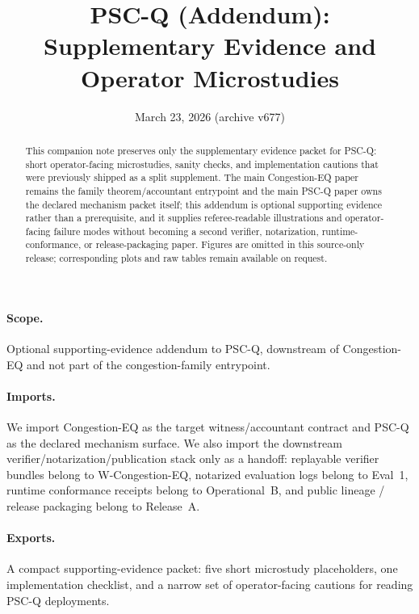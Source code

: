 \documentclass[11pt]{article}
\title{PSC-Q (Addendum):\\Supplementary Evidence and Operator Microstudies}
\author{}
\date{March 23, 2026 (archive v677)}
\theoremstyle{definition}
\theoremstyle{remark}
\begin{document}
\maketitle

\begin{abstract}
This companion note preserves only the supplementary evidence packet for PSC-Q: short operator-facing microstudies, sanity checks, and implementation cautions that were previously shipped as a split supplement.
The main Congestion-EQ paper remains the family theorem/accountant entrypoint and the main PSC-Q paper owns the declared mechanism packet itself; this addendum is optional supporting evidence rather than a prerequisite, and it supplies referee-readable illustrations and operator-facing failure modes without becoming a second verifier, notarization, runtime-conformance, or release-packaging paper.
Figures are omitted in this source-only release; corresponding plots and raw tables remain available on request.\cite{series:artifactpolicy}
\end{abstract}

\paragraph{Scope.}
Optional supporting-evidence addendum to PSC-Q, downstream of Congestion-EQ and not part of the congestion-family entrypoint.\cite{series:congeq,series:pscq}

\paragraph{Imports.}
We import Congestion-EQ as the target witness/accountant contract and PSC-Q as the declared mechanism surface.\cite{series:congeq,series:pscq}
We also import the downstream verifier/notarization/publication stack only as a handoff: replayable verifier bundles belong to W-Congestion-EQ, notarized evaluation logs belong to Eval~1, runtime conformance receipts belong to Operational~B, and public lineage / release packaging belong to Release~A.\cite{series:wcongeq,series:evalnotary,series:opb,series:releaseproperty}

\paragraph{Exports.}
A compact supporting-evidence packet: five short microstudy placeholders, one implementation checklist, and a narrow set of operator-facing cautions for reading PSC-Q deployments.
\end{document}
